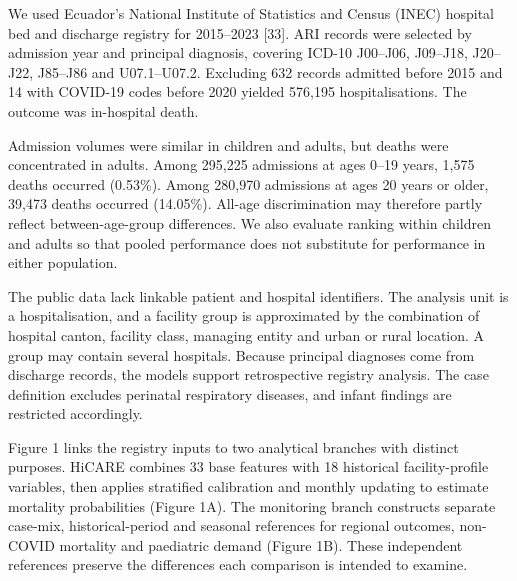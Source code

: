 \documentclass[11pt,a4paper]{article}
\newcommand{\mainheading}[1]{\par\needspace{4\baselineskip}\vspace{7pt}{\large\bfseries #1}\par\vspace{3pt}}
\newcommand{\subheading}[1]{\par\needspace{3\baselineskip}\vspace{5pt}{\bfseries #1}\par\vspace{1pt}}
\begin{document}
\clearpage
\mainheading{3 Data and methods}
\subheading{3.1 National registry cohort}
We used Ecuador's National Institute of Statistics and Census (INEC) hospital bed and discharge registry for 2015–2023 [33]. ARI records were selected by admission year and principal diagnosis, covering ICD-10 J00–J06, J09–J18, J20–J22, J85–J86 and U07.1–U07.2. Excluding 632 records admitted before 2015 and 14 with COVID-19 codes before 2020 yielded 576,195 hospitalisations. The outcome was in-hospital death.

Admission volumes were similar in children and adults, but deaths were concentrated in adults. Among 295,225 admissions at ages 0–19 years, 1,575 deaths occurred (0.53\%). Among 280,970 admissions at ages 20 years or older, 39,473 deaths occurred (14.05\%). All-age discrimination may therefore partly reflect between-age-group differences. We also evaluate ranking within children and adults so that pooled performance does not substitute for performance in either population.

The public data lack linkable patient and hospital identifiers. The analysis unit is a hospitalisation, and a facility group is approximated by the combination of hospital canton, facility class, managing entity and urban or rural location. A group may contain several hospitals. Because principal diagnoses come from discharge records, the models support retrospective registry analysis. The case definition excludes perinatal respiratory diseases, and infant findings are restricted accordingly.

\subheading{3.2 Separate references for risk estimation and outcome comparison}
Figure 1 links the registry inputs to two analytical branches with distinct purposes. HiCARE combines 33 base features with 18 historical facility-profile variables, then applies stratified calibration and monthly updating to estimate mortality probabilities (Figure 1A). The monitoring branch constructs separate case-mix, historical-period and seasonal references for regional outcomes, non-COVID mortality and paediatric demand (Figure 1B). These independent references preserve the differences each comparison is intended to examine.

\clearpage
\end{document}
